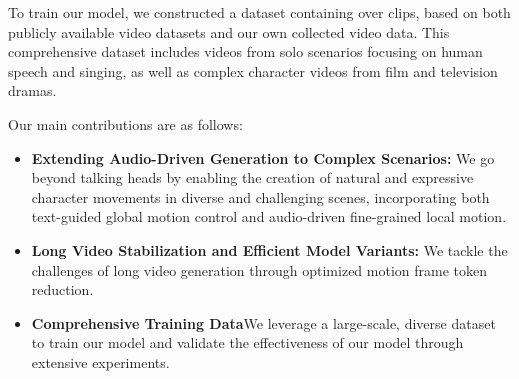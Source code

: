 
To train our model, we constructed a dataset containing over clips, based on both publicly available video datasets and our own collected video data. This comprehensive dataset includes videos from solo scenarios focusing on human speech and singing, as well as complex character videos from film and television dramas. 

Our main contributions are as follows:
\begin{itemize}
    \item \textbf{Extending Audio-Driven Generation to Complex Scenarios:} We go beyond talking heads by enabling the creation of natural and expressive character movements in diverse and challenging scenes, incorporating both text-guided global motion control and audio-driven fine-grained local motion.
    \item \textbf{Long Video Stabilization and Efficient Model Variants:} We tackle the challenges of long video generation through optimized motion frame token reduction.
    \item \textbf{Comprehensive Training Data}We leverage a large-scale, diverse dataset to train our model and validate the effectiveness of our model through extensive experiments.
\end{itemize}







